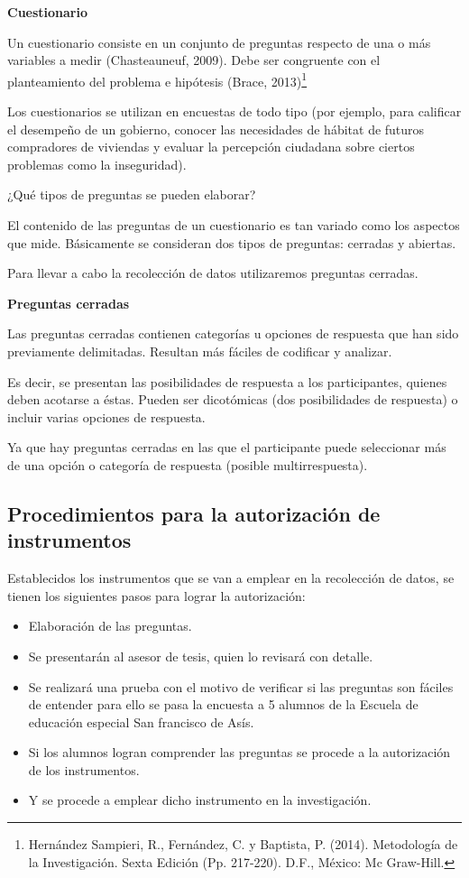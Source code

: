 \documentclass[12pt]{report}%
\begin{document}
\textbf{Cuestionario}

Un cuestionario consiste en un conjunto de preguntas respecto de una o más variables a medir (Chasteauneuf, 2009). Debe ser congruente con el planteamiento del problema e hipótesis (Brace, 2013)\footnote{Hernández Sampieri, R., Fernández, C. y Baptista, P. (2014). Metodología de la Investigación. Sexta Edición (Pp. 217-220). D.F., México: Mc Graw-Hill.}

Los cuestionarios se utilizan en encuestas de todo tipo (por ejemplo, para calificar el desempeño de un gobierno, conocer las necesidades de hábitat de futuros compradores de viviendas y evaluar la percepción ciudadana sobre ciertos problemas como la inseguridad).

¿Qué tipos de preguntas se pueden elaborar? 

El contenido de las preguntas de un cuestionario es tan variado como los aspectos que mide. 
Básicamente se consideran dos tipos de preguntas: cerradas y abiertas. 

Para llevar a cabo la recolección de datos utilizaremos preguntas cerradas.

\textbf{Preguntas cerradas}

Las preguntas cerradas contienen categorías u opciones de respuesta que han sido previamente delimitadas. Resultan más fáciles de codificar y analizar. 

Es decir, se presentan las posibilidades de respuesta a los participantes, quienes deben acotarse a éstas. Pueden ser dicotómicas (dos posibilidades de respuesta) o incluir varias opciones de respuesta.

Ya que hay preguntas cerradas en las que el participante puede seleccionar más de una opción o categoría de respuesta (posible multirrespuesta).


\subsection{Procedimientos para la autorización de instrumentos}
Establecidos los instrumentos que se van a emplear en la recolección de datos, se tienen los siguientes pasos para lograr la autorización:
\begin{itemize}
\item Elaboración de las preguntas.
\item Se presentarán al asesor de tesis, quien lo revisará con detalle.
\item Se realizará una prueba con el motivo de verificar si las preguntas son fáciles de entender para ello se pasa la encuesta a 5 alumnos de la Escuela de educación especial San francisco de Asís.
\item Si los alumnos logran comprender las preguntas se procede a la autorización de los instrumentos.
\item Y se procede a emplear dicho instrumento en la investigación.  
\end{itemize}
\end{document}
